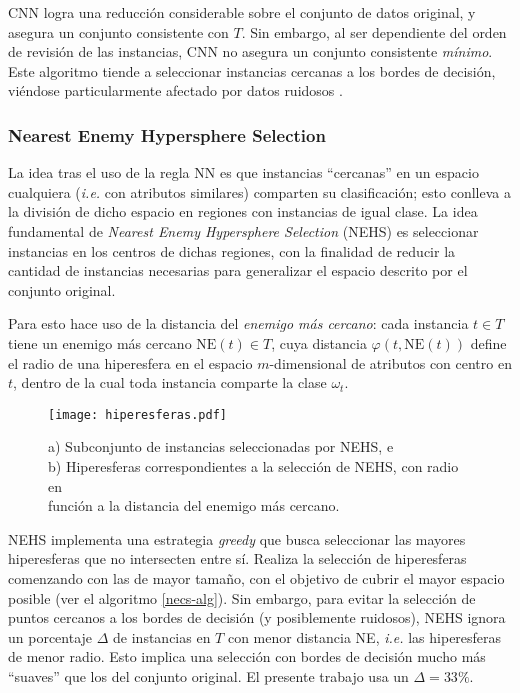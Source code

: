 CNN logra una reducción considerable sobre el conjunto de datos original, y asegura un conjunto consistente con $T$. Sin embargo, al ser dependiente del orden de revisión de las instancias, CNN no asegura un conjunto consistente \emph{mínimo}. Este algoritmo tiende a seleccionar instancias cercanas a los bordes de decisión, viéndose particularmente afectado por datos ruidosos \cite{amal2011survey, Jankowski_comparisonof}.

\subsubsection{Nearest Enemy Hypersphere Selection}

La idea tras el uso de la regla NN es que instancias ``cercanas'' en un espacio cualquiera (\emph{i.e.} con atributos similares) comparten su clasificación; esto conlleva a la división de dicho espacio en regiones con instancias de igual clase. La idea fundamental de \emph{Nearest Enemy Hypersphere Selection} (NEHS) es seleccionar instancias en los centros de dichas regiones, con la finalidad de reducir la cantidad de instancias necesarias para generalizar el espacio descrito por el conjunto original.

Para esto hace uso de la distancia del \emph{enemigo más cercano}: cada instancia $t \in T$ tiene un enemigo más cercano $\mathrm{NE}(t) \in T$, cuya distancia $\varphi(t,\mathrm{NE}(t))$ define el radio de una hiperesfera en el espacio $m$-dimensional de atributos con centro en $t$, dentro de la cual toda instancia comparte la clase $\omega_t$.

\begin{figure}[h!]
\centering
\texttt{[image: hiperesferas.pdf]}
\caption[Selección obtenida por NEHS]{a) Subconjunto de instancias seleccionadas por NEHS, e\\b) Hiperesferas correspondientes a la selección de NEHS, con radio en\\función a la distancia del enemigo más cercano.}
\label{seleccion}
\end{figure}

NEHS implementa una estrategia \emph{greedy} que busca seleccionar las mayores hiperesferas que no intersecten entre sí. Realiza la selección de hiperesferas comenzando con las de mayor tamaño, con el objetivo de cubrir el mayor espacio posible (ver el algoritmo \ref{necs-alg}). Sin embargo, para evitar la selección de puntos cercanos a los bordes de decisión (y posiblemente ruidosos), NEHS ignora un porcentaje $\Delta$ de instancias en $T$ con menor distancia NE, \emph{i.e.} las hiperesferas de menor radio. Esto implica una selección con bordes de decisión mucho más ``suaves'' que los del conjunto original. El presente trabajo usa un $\Delta = 33\%$.

